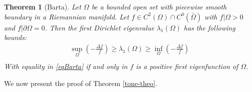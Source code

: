 \documentclass[a4paper]{amsart}
\newtheorem{theorem}{Theorem}[section]
\theoremstyle{definition}
\numberwithin{equation}{section}
\begin{document}
\begin{theorem}[Barta]Let $\Omega$ be a bounded
 open set with piecewise  smooth
boundary  in  a Riemannian manifold.  Let $f \in C^2(\Omega)\cap C^0(\bar \Omega)$ with
$f|\Omega > 0$ and $f|\partial \Omega =0$. Then the first Dirichlet
eigenvalue $\lambda_{1}(\Omega)$ has the following bounds:
\begin{equation}\label{eqBarta}
\begin{array}{ccl}
\displaystyle\sup_{\Omega} (- \frac {\Delta f}{f}) \geq \lambda_1(\Omega)
\geq  \displaystyle\inf_{\Omega}(-\frac{\Delta f}{f})\\
\end{array}
\end{equation}
With equality in \eqref{eqBarta} if and only in $f$ is a positive first eigenfunction
of $\Omega$.\end{theorem} We now present the proof of Theorem \ref{tone-theo}.
\end{document}
